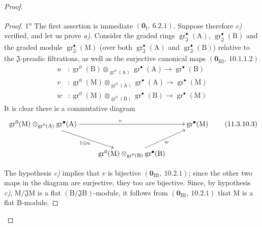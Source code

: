 \begin{proof}
\begin{proof}
1\textsuperscript{o} The first assertion is immediate $(\mathbf{0}_\mathrm{I},~6.2.1)$. Suppose therefore \emph{c)} verified, and let us prove \emph{a)}. Consider the graded rings $\operatorname{gr}^\bullet_\mathfrak{J}(\mathrm{A})$, $\operatorname{gr}^\bullet_\mathfrak{J}(\mathrm{B})$ and the graded module $\operatorname{gr}^\bullet_\mathfrak{J}(\mathrm{M})$ (over both $\operatorname{gr}^\bullet_\mathfrak{J}(\mathrm{A})$ and $\operatorname{gr}^\bullet_\mathfrak{J}(\mathrm{B})$) relative to the $\mathfrak{J}$-preadic filtrations, as well as the surjective canonical maps $(\mathbf{0}_{\mathrm{III}},~10.1.1.2)$
\begin{align*}
  u &: \operatorname{gr}^0(\mathrm{B})\otimes_{\operatorname{gr}^0(\mathrm{A})}\operatorname{gr}^\bullet(\mathrm{A})\to\operatorname{gr}^\bullet(\mathrm{B}) \\
  v &: \operatorname{gr}^0(\mathrm{M})\otimes_{\operatorname{gr}^0(\mathrm{A})}\operatorname{gr}^\bullet(\mathrm{A})\to\operatorname{gr}^\bullet(\mathrm{M}) \\
  w &: \operatorname{gr}^0(\mathrm{M})\otimes_{\operatorname{gr}^0(\mathrm{B})}\operatorname{gr}^\bullet(\mathrm{B})\to\operatorname{gr}^\bullet(\mathrm{M})
\end{align*}
It is clear there is a commutative diagram
\begin{equation}
\xymatrix{
  \operatorname{gr}^0(\mathrm{M})\otimes_{\operatorname{gr}^0(\mathrm{A})}\operatorname{gr}^\bullet(\mathrm{A}) \ar[rr]^{v} \ar[dr]_{1\otimes u} & & \operatorname{gr}^\bullet(\mathrm{M}) \\
  & \operatorname{gr}^0(\mathrm{M})\otimes_{\operatorname{gr}^0(\mathrm{B})}\operatorname{gr}^\bullet(\mathrm{B}) \ar[ur]_{w} &
}
  \label{IV.11.3.10.3}
\tag{11.3.10.3}
\end{equation}

The hypothesis \emph{c)} implies that $v$ is bijective $(\mathbf{0}_{\mathrm{III}},~10.2.1)$; since the other two maps in the diagram are surjective, they too are bijective. Since, by hypothesis \emph{c)}, $\mathrm{M}/\mathfrak{J}\mathrm{M}$ is a flat $(\mathrm{B}/\mathfrak{J}\mathrm{B})$-module, it follows from $(\mathbf{0}_{\mathrm{III}},~10.2.1)$ that $\mathrm{M}$ is a flat $\mathrm{B}$-module.


\end{proof}
\end{proof}
